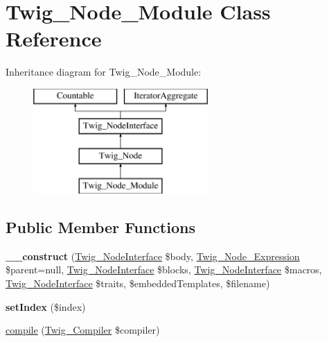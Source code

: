 \hypertarget{classTwig__Node__Module}{}\section{Twig\+\_\+\+Node\+\_\+\+Module Class Reference}
\label{classTwig__Node__Module}
Inheritance diagram for Twig\+\_\+\+Node\+\_\+\+Module\+:\begin{figure}[H]
\begin{center}
\leavevmode
\includegraphics[height=4.000000cm]{classTwig__Node__Module}
\end{center}
\end{figure}
\subsection*{Public Member Functions}
\begin{DoxyCompactItemize}
\item 
{\bfseries \+\_\+\+\_\+construct} (\hyperlink{interfaceTwig__NodeInterface}{Twig\+\_\+\+Node\+Interface} \$body, \hyperlink{classTwig__Node__Expression}{Twig\+\_\+\+Node\+\_\+\+Expression} \$parent=null, \hyperlink{interfaceTwig__NodeInterface}{Twig\+\_\+\+Node\+Interface} \$blocks, \hyperlink{interfaceTwig__NodeInterface}{Twig\+\_\+\+Node\+Interface} \$macros, \hyperlink{interfaceTwig__NodeInterface}{Twig\+\_\+\+Node\+Interface} \$traits, \$embedded\+Templates, \$filename)\hypertarget{classTwig__Node__Module_aa73eb53190da705297ea0dca622e71b1}{}\label{classTwig__Node__Module_aa73eb53190da705297ea0dca622e71b1}

\item 
{\bfseries set\+Index} (\$index)\hypertarget{classTwig__Node__Module_abcc97e4ee105bb38262773fb98785d3c}{}\label{classTwig__Node__Module_abcc97e4ee105bb38262773fb98785d3c}

\item 
\hyperlink{classTwig__Node__Module_a338b8fca467ae8d1e50fc73d99e59fa4}{compile} (\hyperlink{classTwig__Compiler}{Twig\+\_\+\+Compiler} \$compiler)
\end{DoxyCompactItemize}
